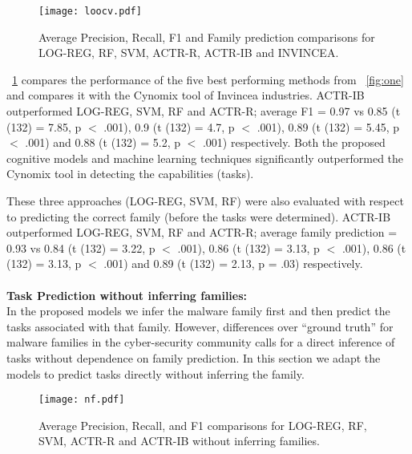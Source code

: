 \documentclass[conference]{IEEEtran}
\begin{document}
\begin{figure}[htp!]
	\centerline{\texttt{[image: loocv.pdf]}}
	\vspace{0em}
	\caption{\textmd{Average Precision, Recall, F1 and Family prediction comparisons for LOG-REG, RF, SVM,  ACTR-R, ACTR-IB and INVINCEA.}}
	\vspace{-1em}
	\label{fig:two}
\end{figure}
\figurename~\ref{fig:two} compares the performance of the five best performing methods from \figurename~\ref{fig:one} and compares it with the Cynomix tool of Invincea industries. ACTR-IB outperformed LOG-REG, SVM, RF and ACTR-R; average F1 = 0.97 vs 0.85 (t (132) = 7.85,   p $<$ .001), 0.9 (t (132) = 4.7, p $<$ .001),  0.89 (t (132) = 5.45,   p $<$ .001) and 0.88 (t (132) = 5.2, p $<$ .001) respectively. Both the proposed cognitive models and machine learning techniques significantly outperformed the Cynomix tool in detecting the capabilities (tasks).

These three approaches (LOG-REG, SVM, RF) were also evaluated with respect to predicting the correct family (before the tasks were determined). ACTR-IB outperformed LOG-REG, SVM, RF and ACTR-R; average family prediction = 0.93 vs 0.84 (t (132) = 3.22,   p $<$ .001), 0.86 (t (132) = 3.13, p $<$ .001),  0.86 (t (132) = 3.13,   p $<$ .001) and 0.89 (t (132) = 2.13, p = .03) respectively.\\\\
{\bf Task Prediction without inferring families:}\\
In the proposed models we infer the malware family first and then predict the tasks associated with that family. However, differences over ``ground truth'' for malware families in the cyber-security community calls for a direct inference of tasks without dependence on family prediction. In this section we adapt the models to predict tasks directly without inferring the family. 
\begin{figure}[htp!]
	\centerline{\texttt{[image: nf.pdf]}}
	\vspace{0em}
	\caption{\textmd{Average Precision, Recall, and F1 comparisons for LOG-REG, RF, SVM,  ACTR-R and ACTR-IB without inferring families.}}
	\vspace{-1em}
	\label{fig:nf}
\end{figure}
\end{document}
